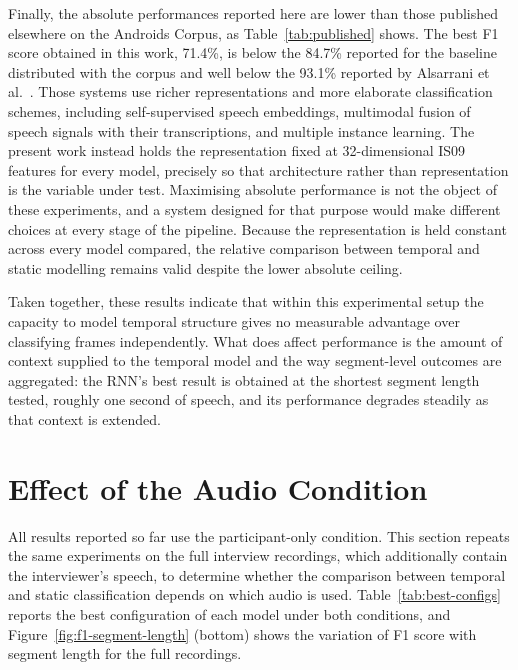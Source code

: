 \documentclass{mproj}
\begin{document}
Finally, the absolute performances reported here are lower than those published elsewhere on the Androids Corpus, as Table~\ref{tab:published} shows. The best F1 score obtained in this work, 71.4\%, is below the 84.7\% reported for the baseline distributed with the corpus \cite{tao2023androids} and well below the 93.1\% reported by Alsarrani et al.\ \cite{alsarrani2025}. Those systems use richer representations and more elaborate classification schemes, including self-supervised speech embeddings, multimodal fusion of speech signals with their transcriptions, and multiple instance learning. The present work instead holds the representation fixed at 32-dimensional IS09 features for every model, precisely so that architecture rather than representation is the variable under test. Maximising absolute performance is not the object of these experiments, and a system designed for that purpose would make different choices at every stage of the pipeline. Because the representation is held constant across every model compared, the relative comparison between temporal and static modelling remains valid despite the lower absolute ceiling.

Taken together, these results indicate that within this experimental setup the capacity to model temporal structure gives no measurable advantage over classifying frames independently. What does affect performance is the amount of context supplied to the temporal model and the way segment-level outcomes are aggregated: the RNN's best result is obtained at the shortest segment length tested, roughly one second of speech, and its performance degrades steadily as that context is extended.

\section{Effect of the Audio Condition}\label{sec:audio-condition}

All results reported so far use the participant-only condition. This section repeats the same experiments on the full interview recordings, which additionally contain the interviewer's speech, to determine whether the comparison between temporal and static classification depends on which audio is used. Table~\ref{tab:best-configs} reports the best configuration of each model under both conditions, and Figure~\ref{fig:f1-segment-length} (bottom) shows the variation of F1 score with segment length for the full recordings.
\end{document}
